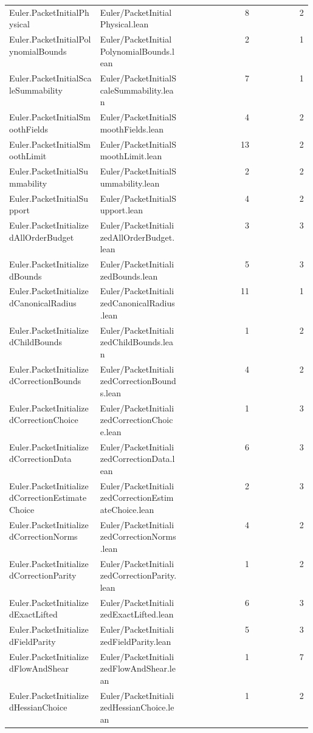 \begin{longtable}{p{0.30\linewidth}p{0.28\linewidth}rr}
Euler.PacketInitialPhysical & Euler/PacketInitialPhysical.lean & 8 & 2\\
Euler.PacketInitialPolynomialBounds & Euler/PacketInitialPolynomialBounds.lean & 2 & 1\\
Euler.PacketInitialScaleSummability & Euler/PacketInitialScaleSummability.lean & 7 & 1\\
Euler.PacketInitialSmoothFields & Euler/PacketInitialSmoothFields.lean & 4 & 2\\
Euler.PacketInitialSmoothLimit & Euler/PacketInitialSmoothLimit.lean & 13 & 2\\
Euler.PacketInitialSummability & Euler/PacketInitialSummability.lean & 2 & 2\\
Euler.PacketInitialSupport & Euler/PacketInitialSupport.lean & 4 & 2\\
Euler.PacketInitializedAllOrderBudget & Euler/PacketInitializedAllOrderBudget.lean & 3 & 3\\
Euler.PacketInitializedBounds & Euler/PacketInitializedBounds.lean & 5 & 3\\
Euler.PacketInitializedCanonicalRadius & Euler/PacketInitializedCanonicalRadius.lean & 11 & 1\\
Euler.PacketInitializedChildBounds & Euler/PacketInitializedChildBounds.lean & 1 & 2\\
Euler.PacketInitializedCorrectionBounds & Euler/PacketInitializedCorrectionBounds.lean & 4 & 2\\
Euler.PacketInitializedCorrectionChoice & Euler/PacketInitializedCorrectionChoice.lean & 1 & 3\\
Euler.PacketInitializedCorrectionData & Euler/PacketInitializedCorrectionData.lean & 6 & 3\\
Euler.PacketInitializedCorrectionEstimateChoice & Euler/PacketInitializedCorrectionEstimateChoice.lean & 2 & 3\\
Euler.PacketInitializedCorrectionNorms & Euler/PacketInitializedCorrectionNorms.lean & 4 & 2\\
Euler.PacketInitializedCorrectionParity & Euler/PacketInitializedCorrectionParity.lean & 1 & 2\\
Euler.PacketInitializedExactLifted & Euler/PacketInitializedExactLifted.lean & 6 & 3\\
Euler.PacketInitializedFieldParity & Euler/PacketInitializedFieldParity.lean & 5 & 3\\
Euler.PacketInitializedFlowAndShear & Euler/PacketInitializedFlowAndShear.lean & 1 & 7\\
Euler.PacketInitializedHessianChoice & Euler/PacketInitializedHessianChoice.lean & 1 & 2\\

\end{longtable}

